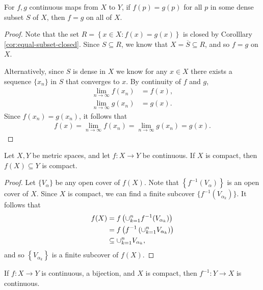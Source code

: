 \begin{cor}\label{cor:equal-dense-equal-everywhere}
    For $f, g$ continuous maps from $X$ to $Y$, if $f(p) = g(p)$ for all $p$ in some dense subset $S$ of $X$, then $f = g$ on all of $X$.
\end{cor}

\begin{proof}
    Note that the set $R = \left\{x \in X : f(x) = g(x)\right\}$ is closed by Corolllary \ref{cor:equal-subset-closed}. Since $S \subseteq R$, we know that $X = \overline{S} \subseteq R$, and so $f = g$ on $X$.

    Alternatively, since $S$ is dense in $X$ we know for any $x \in X$ there exists a sequence $\{x_n\}$ in $S$ that converges to $x$. By continuity of $f$ and $g$,
    \begin{align*}
        \lim_{n\to\infty}f(x_n) &= f(x), \\
        \lim_{n\to\infty}g(x_n) &= g(x).
    \end{align*}
    Since $f(x_n) = g(x_n)$, it follows that
    \begin{align*}
        f(x) = \lim_{n\to\infty}f(x_n) = \lim_{n\to\infty}g(x_n) = g(x).
    \end{align*}
\end{proof}

\begin{thm}\label{thm:continuous-compact-image}
    Let $X, Y$ be metric spaces, and let $f: X \to Y$ be continuous. If $X$ is compact, then $f(X) \subseteq Y$ is compact.
\end{thm}

\begin{proof}
    Let $\{V_{\alpha}\}$ be any open cover of $f(X)$. Note that $\left\{f^{-1}(V_{\alpha})\right\}$ is an open cover of $X$. Since $X$ is compact, we can find a finite subcover $\{f^{-1}(V_{\alpha_k})\}$. It follows that
    \begin{align*}
        f(X) &= f\left(\cup_{k=1}^{n}f^{-1}(V_{\alpha_k})\right) \\
        &= f\left(f^{-1}\left(\cup_{k=1}^{n}V_{\alpha_k}\right)\right) \\
        &\subseteq \cup_{k=1}^{n}V_{\alpha_k},
    \end{align*}
    and so $\left\{V_{\alpha_k}\right\}$ is a finite subcover of $f(X)$.
\end{proof}

\begin{thm}
    If $f: X \to Y$ is continuous, a bijection, and $X$ is compact, then $f^{-1}: Y \to X$ is continuous.
\end{thm}

